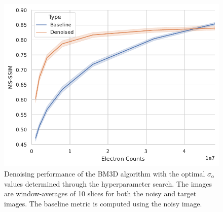 \begin{figure}[h]
    \centering
    \includegraphics[width=0.7\linewidth]{images/bm3d_msssim.pdf}
    \caption{Denoising performance of the \gls{BM3D} algorithm with the optimal $\sigma_{\text{o}}$ values determined through the hyperparameter search. The images are window-averages of 10 slices for both the noisy and target images. The baseline metric is computed using the noisy image.}
    \label{fig:bm3d-msssim}
\end{figure}
